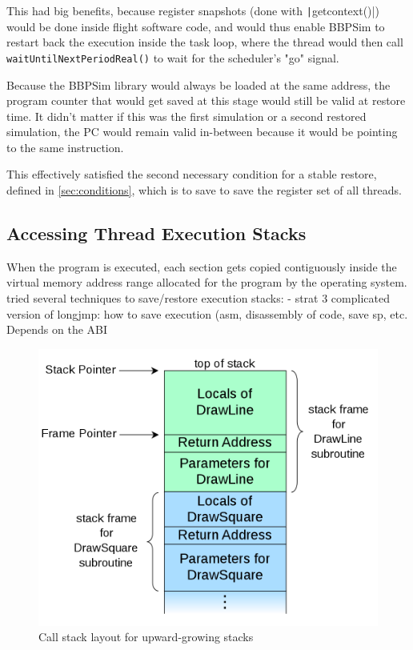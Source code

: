 This had big benefits, because register snapshots (done with \texttt|getcontext()|) would be done inside flight software code, and would thus enable BBPSim to restart back the execution inside the task loop, where the thread would then call \texttt{waitUntilNextPeriodReal()} to wait for the scheduler's "go" signal.

Because the \gls{BBPSim} library would always be loaded at the same address, the program counter that would get saved at this stage would still be valid at restore time. It didn't matter if this was the first simulation or a second restored simulation, the PC would remain valid in-between because it would be pointing to the same instruction. 

This effectively satisfied the second necessary condition for a stable restore, defined in \autoref{sec:conditions}, which is to save to save the register set of all threads.

\subsection*{Accessing Thread Execution Stacks}

When the program is executed, each section gets copied contiguously inside the virtual memory address range allocated for the program by the operating system. 
tried several techniques to save/restore execution stacks:
- strat 3 complicated version of longjmp: how to save execution (asm, disassembly of code, save sp, etc.%
Depends on the ABI

\begin{figure}[htbp]
	\centering
	\includegraphics[width=.6\linewidth,keepaspectratio]{art/call-stack-layout.png}
	\caption{Call stack layout for upward-growing stacks\cite{online:stack-img}}
	\label{fig:call-stack-layout}
\end{figure}
